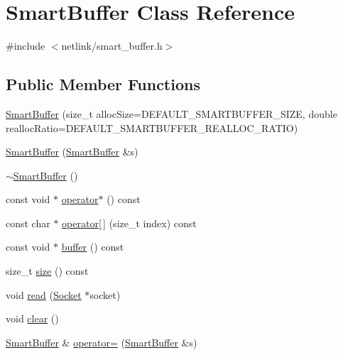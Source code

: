 \hypertarget{classSmartBuffer}{}\section{Smart\+Buffer Class Reference}
\label{classSmartBuffer}


{\ttfamily \#include $<$netlink/smart\+\_\+buffer.\+h$>$}

\subsection*{Public Member Functions}
\begin{DoxyCompactItemize}
\item 
\hyperlink{classSmartBuffer_ae7b059bbd714dcda7386b11c7e00ee0d}{Smart\+Buffer} (size\+\_\+t alloc\+Size=D\+E\+F\+A\+U\+L\+T\+\_\+\+S\+M\+A\+R\+T\+B\+U\+F\+F\+E\+R\+\_\+\+S\+I\+Z\+E, double realloc\+Ratio=D\+E\+F\+A\+U\+L\+T\+\_\+\+S\+M\+A\+R\+T\+B\+U\+F\+F\+E\+R\+\_\+\+R\+E\+A\+L\+L\+O\+C\+\_\+\+R\+A\+T\+I\+O)
\item 
\hyperlink{classSmartBuffer_a9058e1103bf628a075415390b02bffc2}{Smart\+Buffer} (\hyperlink{classSmartBuffer}{Smart\+Buffer} \&s)
\item 
\hyperlink{classSmartBuffer_a4ee71a48ec838b2b5ef43a32c5de8126}{$\sim$\+Smart\+Buffer} ()
\item 
const void $\ast$ \hyperlink{classSmartBuffer_afc1dc164bd7107b515b2d0642fdc5d43}{operator$\ast$} () const 
\item 
const char $\ast$ \hyperlink{classSmartBuffer_a8e17ba4a6f2f8dfdbe368469201fc4ef}{operator\mbox{[}$\,$\mbox{]}} (size\+\_\+t index) const 
\item 
const void $\ast$ \hyperlink{classSmartBuffer_a4a65be9a7a1e3c1914ffccf35a35f3f1}{buffer} () const 
\item 
size\+\_\+t \hyperlink{classSmartBuffer_aa2246cfac251b00cbaeb3763fa1aa11e}{size} () const 
\item 
void \hyperlink{classSmartBuffer_abb25b6f9ab458ee2eadde5f42c377f4e}{read} (\hyperlink{classSocket}{Socket} $\ast$socket)
\item 
void \hyperlink{classSmartBuffer_a6b1e284efe0d8c04bd964016a83340b3}{clear} ()
\item 
\hyperlink{classSmartBuffer}{Smart\+Buffer} \& \hyperlink{classSmartBuffer_aad00b9914962b562c6d59e2391b9deb3}{operator=} (\hyperlink{classSmartBuffer}{Smart\+Buffer} \&s)
\end{DoxyCompactItemize}


